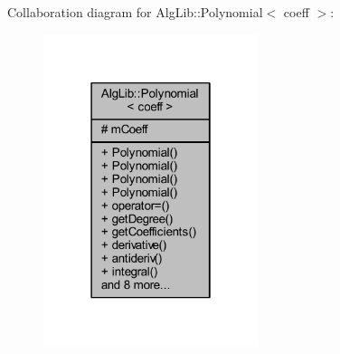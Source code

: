 Collaboration diagram for Alg\+Lib\+:\+:Polynomial$<$ coeff $>$\+:\nopagebreak
\begin{figure}[H]
\begin{center}
\leavevmode
\includegraphics[width=178pt]{class_alg_lib_1_1_polynomial__coll__graph}
\end{center}
\end{figure}
